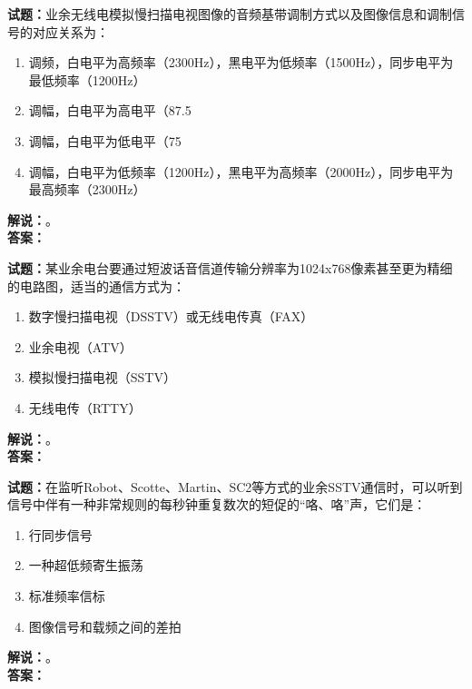 \documentclass{ctexbook}
\begin{document}
\bigskip




\noindent\textbf{试题：}业余无线电模拟慢扫描电视图像的音频基带调制方式以及图像信息和调制信号的对应关系为：
\begin{enumerate}[leftmargin=3em]
\item 调频，白电平为高频率（2300Hz），黑电平为低频率（1500Hz），同步电平为最低频率（1200Hz）
\item 调幅，白电平为高电平（87.5%
\item 调幅，白电平为低电平（75%
\item 调幅，白电平为低频率（1200Hz），黑电平为高频率（2000Hz），同步电平为最高频率（2300Hz）
\end{enumerate}
\noindent\textbf{解说：}\textbf{}。\\\noindent\textbf{答案：}

\bigskip




\noindent\textbf{试题：}某业余电台要通过短波话音信道传输分辨率为1024x768像素甚至更为精细的电路图，适当的通信方式为：
\begin{enumerate}[leftmargin=3em]
\item 数字慢扫描电视（DSSTV）或无线电传真（FAX）
\item 业余电视（ATV）
\item 模拟慢扫描电视（SSTV）
\item 无线电传（RTTY）
\end{enumerate}
\noindent\textbf{解说：}\textbf{}。\\\noindent\textbf{答案：}

\bigskip




\noindent\textbf{试题：}在监听Robot、Scotte、Martin、SC2等方式的业余SSTV通信时，可以听到信号中伴有一种非常规则的每秒钟重复数次的短促的“咯、咯”声，它们是：
\begin{enumerate}[leftmargin=3em]
\item 行同步信号
\item 一种超低频寄生振荡
\item 标准频率信标
\item 图像信号和载频之间的差拍
\end{enumerate}
\noindent\textbf{解说：}\textbf{}。\\\noindent\textbf{答案：}

\bigskip
\end{document}
